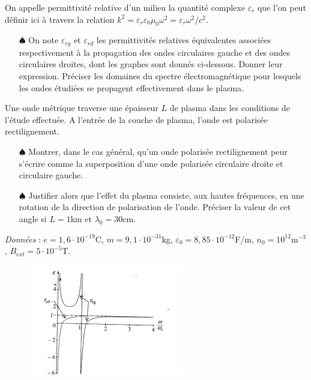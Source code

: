 \documentclass{report}
\begin{document}
On appelle permittivité relative d'un milieu la quantité complexe $\varepsilon_r$ que l'on peut définir ici à travers la relation $k^2=\varepsilon_r\varepsilon_0\mu_0\omega^2=\varepsilon_r\omega^2/c^2$. 

\begin{itemize}

	\item[$\spadesuit$] On note $\varepsilon_{rg}$ et $\varepsilon_{rd}$ les permittivités relatives équivalentes associées respectivement à la propagation des ondes circulaires gauche et des ondes circulaires droites, dont les graphes sont donnés ci-dessous. Donner leur expression. Préciser les domaines du spectre électromagnétique pour lesquels les ondes étudiées se propagent effectivement dans le plasma.

\end{itemize}

Une onde métrique traverse une épaisseur $L$ de plasma dans les conditions de l'étude effectuée. A l'entrée de la couche de plasma, l'onde est polarisée rectilignement.

\begin{itemize}
	
	\item[$\spadesuit$] Montrer, dans le cas général, qu'un onde polarisée rectilignement peur s'écrire comme la superposition d'une onde polarisée circulaire droite et circulaire gauche. 
	
	\item[$\spadesuit$] Justifier alors que l'effet du plasma consiste, aux hautes fréquences, en une rotation de la direction de polarisation de l'onde. Préciser la valeur de cet angle si $L=1$km et $\lambda_0=30$cm.
	
\end{itemize}

\textit{Données} : $e=1,6\cdot10^{-19}$C, $m=9,1\cdot10^{-31}$kg, $\varepsilon_0=8,85\cdot10^{-12}$F/m, $n_0=10^{12}$m$^{-3}$, $B_{ext}=5\cdot10^{-5}$T.

\newpage

\begin{figure}[h!]
\centering
  \includegraphics[width=0.6\textwidth]{permittivite1.png}
\end{figure}
\end{document}

